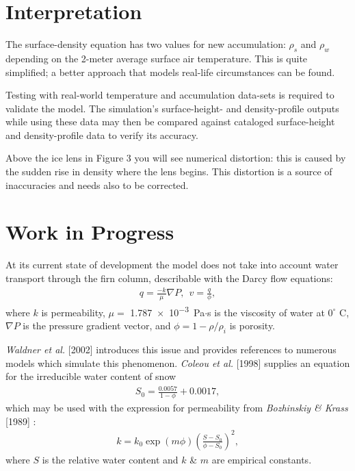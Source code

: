 \documentclass{article}%
\begin{document}
\section{Interpretation}

The surface-density equation has two values for new accumulation: $\rho_s$ and $\rho_w$ depending on the 2-meter average surface air temperature.  This is quite simplified; a better approach that models real-life circumstances can be found.  

Testing with real-world temperature and accumulation data-sets is required to validate the model.  The simulation's surface-height- and density-profile outputs while using these data may then be compared against cataloged surface-height and density-profile data to verify its accuracy.

Above the ice lens in Figure 3 you will see numerical distortion: this is caused by the sudden rise in density where the lens begins.  This distortion is a source of inaccuracies and needs also to be corrected.

\section{Work in Progress}
At its current state of development the model does not take into account water transport through the firn column, describable with the Darcy flow equations:
\begin{align*}
    q = \frac{-k}{\mu}\nabla P, \ \  v = \frac{q}{\phi},
\end{align*}
where $k$ is permeability, $\mu =$ \SI{1.787e-3} Pa$\cdot$s is the viscosity of water at $0^{\circ}$ C, $\nabla P$ is the pressure gradient vector, and $\phi = 1- \rho/\rho_i$ is porosity.

\emph{Waldner et al.} [2002] introduces this issue and provides references to numerous models which simulate this phenomenon.  \emph{Coleou et al.} [1998] supplies an equation for the irreducible water content of snow
\begin{align*}
    S_0 = \frac{0.0057}{1 - \phi} + 0.0017,
\end{align*}
which may be used with the expression for permeability from \emph{Bozhinskiy \& Krass} [1989] :
\begin{align*}
    k = k_0 \exp(m \phi)\left( \frac{S - S_0}{\phi - S_0} \right)^2,
\end{align*}
where $S$ is the relative water content and $k$ \& $m$ are empirical constants.
\end{document}
